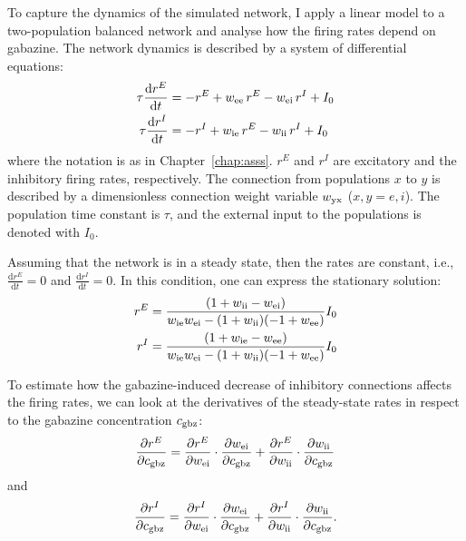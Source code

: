     To capture the dynamics of the simulated network, I apply a linear model to
    a two-population balanced network and analyse how the firing rates depend
    on gabazine. The network dynamics is described by a system of differential
    equations:
    \begin{equation}
      \begin{split}
        \tau \frac{\text{d}r^E}{\text{d}t} &= - r^E + w_{\rm ee} \, r^E -w_{\rm ei} \, r^I + I_0\\
        \tau \frac{\text{d}r^I}{\text{d}t} &= - r^I + w_{\rm ie} \, r^E -w_{\rm ii} \, r^I + I_0\\
      \end{split}
      \label{eq:balanced_net}
    \end{equation}
    where the notation is as in Chapter~\ref{chap:asss}. $r^E$ and
    $r^I$ are excitatory and the inhibitory firing rates, respectively. The
    connection from populations $x$ to $y$ is described by a dimensionless
    connection weight variable $w_{\rm yx}$ ($x,y = e, i$). The population time
    constant is $\tau$, and the external input to the populations is denoted
    with $I_0$.

    Assuming that the network is in a steady state, then the rates are
    constant, i.e., $ \frac{\text{d}r^E}{\text{d}t} = 0$ and
    $\frac{\text{d}r^I}{\text{d}t} = 0 $. In this condition, one can express
    the stationary solution:
    \begin{equation}
      \begin{split}
        r^E &= \frac{(1+w_{\rm ii} - w_{\rm ei})}{w_{\rm ie}w_{\rm ei} -
                (1+w_{\rm ii})(-1+w_{\rm ee})} I_0 \\
        r^I &= \frac{(1+w_{\rm ie} - w_{\rm ee})}{w_{\rm ie}w_{\rm ei} -
                (1+w_{\rm ii})(-1+w_{\rm ee})} I_0
      \end{split}
      \label{eq:balanced_sol}
    \end{equation}
  
    To estimate how the gabazine-induced decrease of inhibitory connections
    affects the firing rates, we can look at the derivatives of the
    steady-state rates in respect to the gabazine concentration $c_{\rm gbz}$:
    \begin{equation}
      \frac{\partial r^E}{\partial c_{\rm gbz}} =
      \frac{\partial r^E}{\partial w_{\rm ei}} \cdot \frac{\partial w_{\rm ei}}{\partial c_{\rm gbz}} + 
      \frac{\partial r^E}{\partial w_{\rm ii}} \cdot \frac{\partial w_{\rm ii}}{\partial c_{\rm gbz}}
      \label{eq:re_chain}
    \end{equation}
    and
    \begin{equation}
      \frac{\partial r^I}{\partial c_{\rm gbz}} =
      \frac{\partial r^I}{\partial w_{\rm ei}} \cdot \frac{\partial w_{\rm ei}}{\partial c_{\rm gbz}} + 
      \frac{\partial r^I}{\partial w_{\rm ii}} \cdot \frac{\partial w_{\rm ii}}{\partial c_{\rm gbz}}.
      \label{eq:ri_chain}
    \end{equation}

